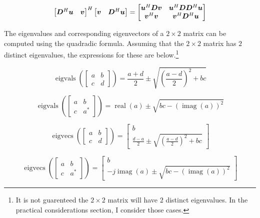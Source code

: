 \documentclass{article}
\begin{document}
\begin{equation}
\begin{bmatrix}
\bm{D}^H\bm{u} & \bm{v}
\end{bmatrix}^H
\begin{bmatrix}
\bm{v} & \bm{D}^H\bm{u} 
\end{bmatrix}
 = 
\begin{bmatrix}
\bm{u}^H\bm{D}\bm{v} & \bm{u}^H\bm{D}\bm{D}^H\bm{u} \\
\bm{v}^H\bm{v}    & \bm{v}^H\bm{D}^H\bm{u}
\end{bmatrix}
\end{equation}

The eigenvalues and corresponding eigenvectors of a $2 \times 2$ matrix can be computed using the quadradic formula. Assuming that the $2 \times 2$ matrix has $2$ distinct eigenvalues, the expressions for these are below.\footnote{It is not guarenteed the $2 \times 2$ matrix will have $2$ distinct eigenvalues. In the practical considerations section, I consider those cases.}

\begin{equation}
\operatorname{eigvals}(\begin{bmatrix} a & b \\ c & d \end{bmatrix}) = \frac{a + d}{2} \pm \sqrt{(\frac{a - d}{2})^2 + bc}
\end{equation}

\begin{equation}
\operatorname{eigvals}(\begin{bmatrix} a & b \\ c & a^* \end{bmatrix}) = \operatorname{real}(a) \pm \sqrt{bc - (\operatorname{imag}(a))^2}
\end{equation}

\begin{equation}
\operatorname{eigvecs}(\begin{bmatrix} a & b \\ c & d \end{bmatrix}) = \begin{bmatrix} b \\ \frac{d - a}{2} \pm \sqrt{(\frac{a - d}{2})^2 + bc}\end{bmatrix}
\end{equation}

\begin{equation}
\operatorname{eigvecs}(\begin{bmatrix} a & b \\ c & a^* \end{bmatrix}) = \begin{bmatrix} b \\ -j\operatorname{imag}(a) \pm \sqrt{bc - (\operatorname{imag}(a))^2}\end{bmatrix}
\end{equation}
\end{document}
